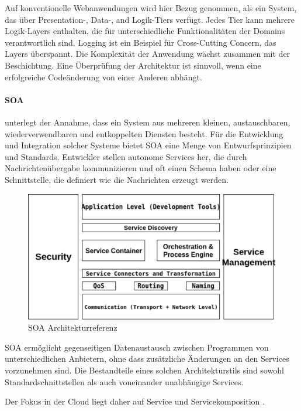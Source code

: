\documentclass[
12pt,
english,
ngerman,
headsepline,
twoside,
openright,
numbers=noenddot,version=first
]{scrreprt}
\begin{document}
Auf konventionelle Webanwendungen wird hier Bezug genommen, als ein System, das über Presentation-, Data-, and Logik-Tiers verfügt. Jedes Tier kann mehrere Logik-Layers enthalten, die für unterschiedliche Funktionalitäten der Domains verantwortlich sind. Logging ist ein Beispiel für Cross-Cutting Concern, das Layers überspannt. Die Komplexität der Anwendung wächst zusammen mit der Beschichtung.
Eine Überprüfung der Architektur ist sinnvoll, wenn eine erfolgreiche Codeänderung von einer Anderen abhängt.

\paragraph{\acrfull{SOA}}
\label{sec:soa} unterlegt der Annahme, dass ein System aus mehreren kleinen, austauschbaren, wiederverwendbaren und entkoppelten Diensten besteht. Für die Entwicklung und Integration solcher Systeme bietet \acrshort{SOA} eine Menge von Entwurfsprinzipien und Standards. Entwickler stellen autonome Services her, die durch Nachrichtenübergabe kommunizieren und oft einen Schema haben oder eine Schnittstelle, die definiert wie die Nachrichten erzeugt werden.\cite{cloudEssentials}

\begin{figure}[H]
	\centering	
	\includegraphics[scale=0.80]{./pics/arch-soa.eps}
	\caption{SOA Architekturreferenz\cite{archSoa}}
	\label{pic:arch-soa}
\end{figure}


SOA ermöglicht gegenseitigen Datenaustausch zwischen Programmen von unterschiedlichen Anbietern, ohne dass zusätzliche Änderungen an den Services vorzunehmen sind. Die Bestandteile eines solchen Architekturstils sind sowohl Standardschnittstellen als auch voneinander unabhängige Services\cite{archSoa}. 

Der Fokus in der Cloud liegt daher auf Service und Servicekomposition \cite{cloudEssentials}.
\end{document}
